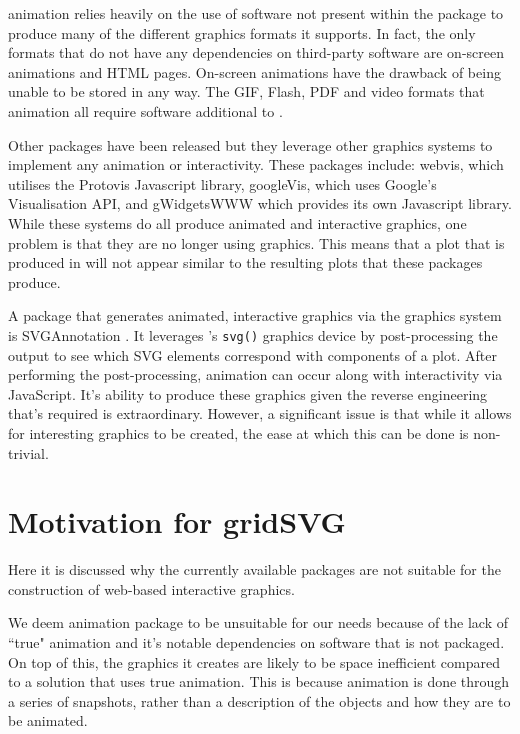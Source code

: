 \textsf{animation} relies heavily on the use of software not present within the package to produce many of the different graphics formats it supports.
In fact, the only formats that do not have any dependencies on third-party software are on-screen animations and HTML pages.
On-screen animations have the drawback of being unable to be stored in any way.
The GIF, Flash, PDF and video formats that \textsf{animation} all require software additional to \R{}.

Other packages have been released but they leverage other graphics systems to implement any animation or interactivity.
These packages include: \textsf{webvis}, which utilises the Protovis Javascript library, \textsf{googleVis}, which uses Google's Visualisation API, and \textsf{gWidgetsWWW} which provides its own Javascript library.
While these systems do all produce animated and interactive graphics, one problem is that they are no longer using \R{} graphics.
This means that a plot that is produced in \R{} will not appear similar to the resulting plots that these packages produce. 

A package that generates animated, interactive graphics via the \R{} graphics system is \textsf{SVGAnnotation} \citet{SVGAnnotation}.
It leverages \R{}'s \texttt{svg()} graphics device by post-processing the output to see which SVG elements correspond with components of a plot.
After performing the post-processing, animation can occur along with interactivity via JavaScript.
It's ability to produce these graphics given the reverse engineering that's required is extraordinary.
However, a significant issue is that while it allows for interesting graphics to be created, the ease at which this can be done is non-trivial.

\section{Motivation for gridSVG}

Here it is discussed why the currently available \R{} packages are not suitable for the construction of web-based interactive graphics.

We deem \textsf{animation} package to be unsuitable for our needs because of the lack of ``true" animation and it's notable dependencies on software that is not packaged.
On top of this, the graphics it creates are likely to be space inefficient compared to a solution that uses true animation.
This is because animation is done through a series of snapshots, rather than a description of the objects and how they are to be animated.

